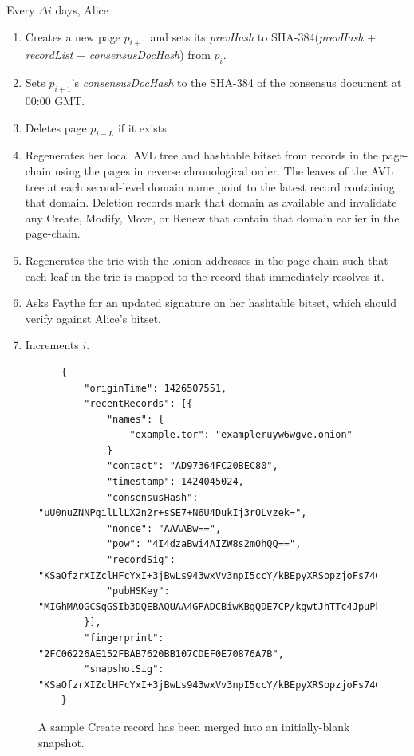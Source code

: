 Every $ \Delta i $ days, Alice

\begin{enumerate}
	\item Creates a new page $ p_{i + 1} $ and sets its \emph{prevHash} to SHA-384(\emph{prevHash} + \emph{recordList} + \emph{consensusDocHash}) from $ p_{i} $.
	\item Sets $ p_{i + 1} $'s \emph{consensusDocHash} to the SHA-384 of the consensus document at 00:00 GMT.
	\item Deletes page $ p_{i - L} $ if it exists.
	\item Regenerates her local AVL tree and hashtable bitset from records in the page-chain using the pages in reverse chronological order. The leaves of the AVL tree at each second-level domain name point to the latest record containing that domain. Deletion records mark that domain as available and invalidate any Create, Modify, Move, or Renew that contain that domain earlier in the page-chain.
	\item Regenerates the trie with the .onion addresses in the page-chain such that each leaf in the trie is mapped to the record that immediately resolves it.
	\item Asks Faythe for an updated signature on her hashtable bitset, which should verify against Alice's bitset.
	\item Increments $ i $.
\end{enumerate}

\begin{figure}
	\begin{lstlisting}
	{
		"originTime": 1426507551,
		"recentRecords": [{
			"names": {
				"example.tor": "exampleruyw6wgve.onion"
			}
			"contact": "AD97364FC20BEC80",
			"timestamp": 1424045024,
			"consensusHash": "uU0nuZNNPgilLlLX2n2r+sSE7+N6U4DukIj3rOLvzek=",
			"nonce": "AAAABw==",
			"pow": "4I4dzaBwi4AIZW8s2m0hQQ==",
			"recordSig": 	"KSaOfzrXIZclHFcYxI+3jBwLs943wxVv3npI5ccY/kBEpyXRSopzjoFs746n0tJqUpdY4Kbe6DBwERaN7ELmSSK9Pu6q8QeKzNAh+QOnKl0fKBN7fqowjkQ3ktFkR0Vuox9WrrbNTMa4+up0Np52hlbKA3zSRz4fbR9NVlh6uuQ=",
			"pubHSKey": "MIGhMA0GCSqGSIb3DQEBAQUAA4GPADCBiwKBgQDE7CP/kgwtJhTTc4JpuPkvA7Ln9wgc+fgTKgkyUp1zusxgUAn1c1MGx4YhO42KPB7dyZOf3pcRk94XsYFY1ULkF2+tf9KdNe7GFzJyMFCQENnUcVXbcwLH4vAeiGK7R/nScbCbyc9LT+VE1fbKchTL1QzLVBLqJTxhR+9YPi8x+QIFAdZ8BJs="
		}],
		"fingerprint": "2FC06226AE152FBAB7620BB107CDEF0E70876A7B",
		"snapshotSig": "KSaOfzrXIZclHFcYxI+3jBwLs943wxVv3npI5ccY/kBEpyXRSopzjoFs746n0tJqUpdY4Kbe6DBwERaN7ELmSSK9Pu6q8QeKzNAh+QOnKl0fKBN7fqowjkQ3ktFkR0Vuox9WrrbNTMa4+up0Np52hlbKA3zSRz4fbR9NVlh6uuQ="
	}
	\end{lstlisting}
	\caption{A sample Create record has been merged into an initially-blank snapshot.}
	\label{fig:recordInSS}
\end{figure}

